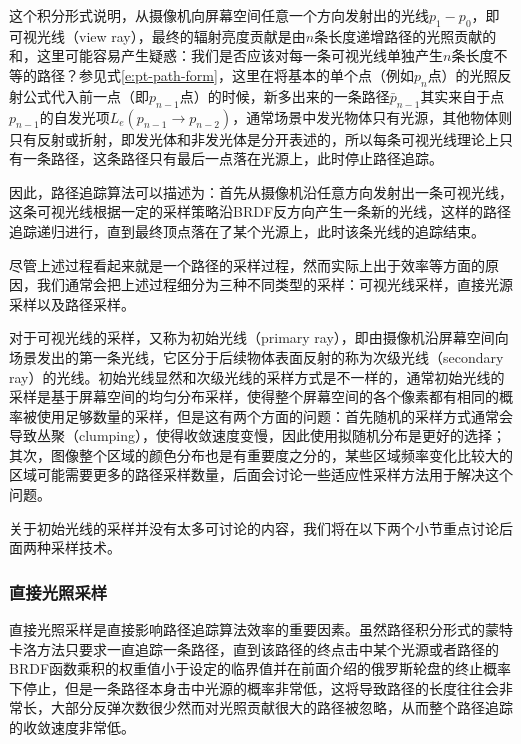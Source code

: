 这个积分形式说明，从摄像机向屏幕空间任意一个方向发射出的光线$p_1-p_0$，即可视光线（view ray），最终的辐射亮度贡献是由$n$条长度递增路径的光照贡献的和，这里可能容易产生疑惑：我们是否应该对每一条可视光线单独产生$n$条长度不等的路径？参见式\ref{e:pt-path-form}，这里在将基本的单个点（例如$p_n$点）的光照反射公式代入前一点（即$p_{n-1}$点）的时候，新多出来的一条路径$\bar{p}_{n-1}$其实来自于点$p_{n-1}$的自发光项$L_e(p_{n-1}\to p_{n-2})$，通常场景中发光物体只有光源，其他物体则只有反射或折射，即发光体和非发光体是分开表述的，所以每条可视光线理论上只有一条路径，这条路径只有最后一点落在光源上，此时停止路径追踪。

因此，路径追踪算法可以描述为：首先从摄像机沿任意方向发射出一条可视光线，这条可视光线根据一定的采样策略沿BRDF反方向产生一条新的光线，这样的路径追踪递归进行，直到最终顶点落在了某个光源上，此时该条光线的追踪结束。

尽管上述过程看起来就是一个路径的采样过程，然而实际上出于效率等方面的原因，我们通常会把上述过程细分为三种不同类型的采样：可视光线采样，直接光源采样以及路径采样。

对于可视光线的采样，又称为初始光线（primary ray），即由摄像机沿屏幕空间向场景发出的第一条光线，它区分于后续物体表面反射的称为次级光线（secondary ray）的光线。初始光线显然和次级光线的采样方式是不一样的，通常初始光线的采样是基于屏幕空间的均匀分布采样，使得整个屏幕空间的各个像素都有相同的概率被使用足够数量的采样，但是这有两个方面的问题：首先随机的采样方式通常会导致丛聚（clumping），使得收敛速度变慢，因此使用拟随机分布是更好的选择；其次，图像整个区域的颜色分布也是有重要度之分的，某些区域频率变化比较大的区域可能需要更多的路径采样数量，后面会讨论一些适应性采样方法用于解决这个问题。

关于初始光线的采样并没有太多可讨论的内容，我们将在以下两个小节重点讨论后面两种采样技术。






\subsubsection{直接光照采样}\label{sec:pt-direct-illumination}
直接光照采样是直接影响路径追踪算法效率的重要因素。虽然路径积分形式的蒙特卡洛方法只要求一直追踪一条路径，直到该路径的终点击中某个光源或者路径的BRDF函数乘积的权重值小于设定的临界值并在前面介绍的俄罗斯轮盘的终止概率下停止，但是一条路径本身击中光源的概率非常低，这将导致路径的长度往往会非常长，大部分反弹次数很少然而对光照贡献很大的路径被忽略，从而整个路径追踪的收敛速度非常低。

